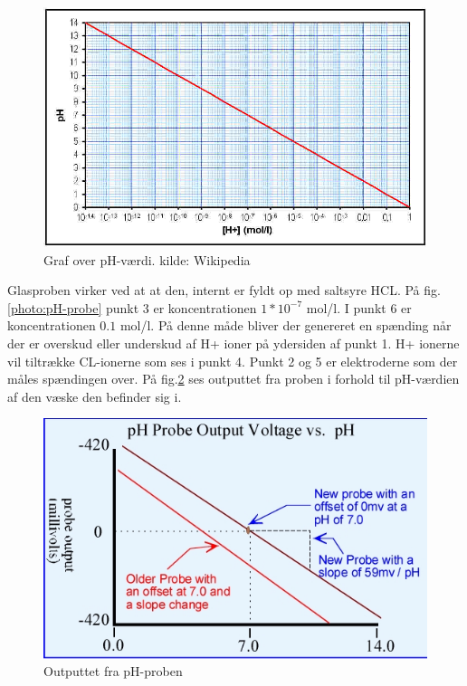  \begin{figure}[H]
	\centering 
	\includegraphics[scale=0.4]{HardwareArkitektur/Sensore/pH_probe_billeder/PH-skala.jpg}
	\caption{Graf over pH-værdi. kilde: Wikipedia}
	\label{photo:pH-skala}
\end{figure}   

Glasproben virker ved at at den, internt er fyldt op med saltsyre HCL. På fig.\ref{photo:pH-probe} punkt 3 er koncentrationen $1*10^{-7}$ mol/l. I punkt 6 er koncentrationen $0.1$ mol/l. På denne måde bliver der genereret en spænding når der er overskud eller underskud af H+ ioner på ydersiden af punkt 1. H+ ionerne vil tiltrække CL-ionerne som ses i punkt 4. Punkt 2 og 5 er elektroderne som der måles spændingen over. På fig.\ref{photo:probeslope} ses outputtet fra proben i forhold til pH-værdien af den væske den befinder sig i. 

 \begin{figure}[H]
	\centering 
	\includegraphics[scale=0.4]{HardwareArkitektur/Sensore/pH_probe_billeder/probeslope.jpg}
	\caption{Outputtet fra pH-proben}
	\label{photo:probeslope}
\end{figure} 

